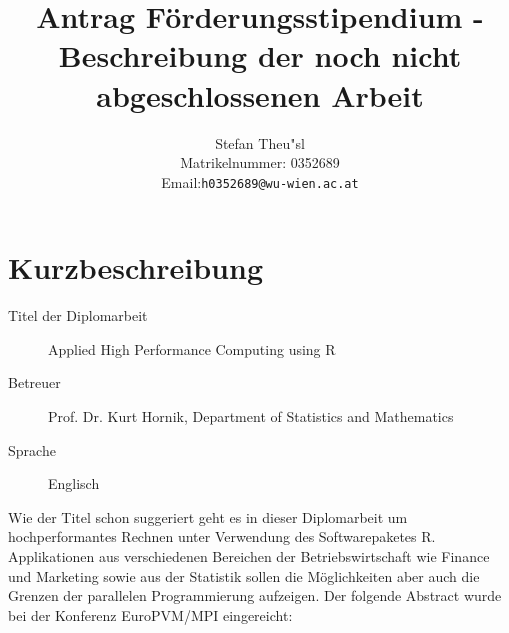 \documentclass[a4paper,fleqn]{article}
\def\email#1{{\tt#1}}
\begin{document}
\title{Antrag F\"orderungsstipendium - Beschreibung der noch nicht
  abgeschlossenen Arbeit}

\author{Stefan Theu"sl \\ Matrikelnummer: 0352689 \\ Email:\email{h0352689@wu-wien.ac.at}}

\maketitle              %

\section{Kurzbeschreibung}

\begin{description}
\item[Titel der Diplomarbeit] Applied High Performance Computing using
  R
\item[Betreuer] Prof. Dr. Kurt Hornik, Department of Statistics and
  Mathematics
\item[Sprache] Englisch

\end{description}

Wie der Titel schon suggeriert geht es in dieser Diplomarbeit um
hochperformantes Rechnen unter Verwendung des Softwarepaketes
R. Applikationen aus verschiedenen Bereichen der
Betriebswirtschaft wie Finance und Marketing sowie aus der Statistik
sollen die M\"oglichkeiten aber auch die Grenzen der parallelen
Programmierung aufzeigen. Der folgende Abstract wurde bei der
Konferenz EuroPVM/MPI eingereicht: 
\end{document}
